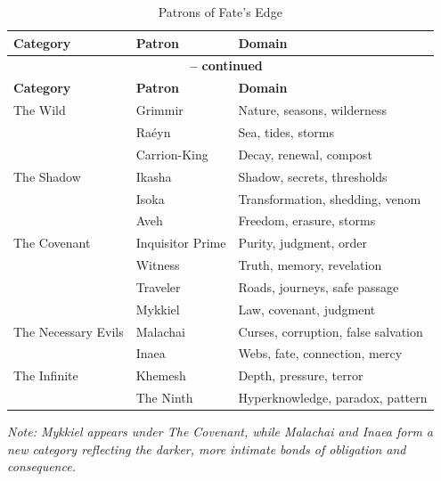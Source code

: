 \documentclass[10pt,a5paper]{book}
\begin{document}
\begin{center}
\begin{longtable}{p{3cm} p{5cm} p{5cm}}
\caption{Patrons of Fate's Edge}\\
\toprule
\textbf{Category} & \textbf{Patron} & \textbf{Domain} \\
\midrule
\endfirsthead
\multicolumn{3}{c}{{\bfseries \tablename\ \thetable{} -- continued}} \\
\toprule
\textbf{Category} & \textbf{Patron} & \textbf{Domain} \\
\midrule
\endhead
\bottomrule
\endfoot

The Wild & Grimmir & Nature, seasons, wilderness \\
      & Raéyn & Sea, tides, storms \\
      & Carrion-King & Decay, renewal, compost \\
\midrule
The Shadow & Ikasha & Shadow, secrets, thresholds \\
      & Isoka & Transformation, shedding, venom \\
      & Aveh & Freedom, erasure, storms \\
\midrule
The Covenant & Inquisitor Prime & Purity, judgment, order \\
      & Witness & Truth, memory, revelation \\
      & Traveler & Roads, journeys, safe passage \\
      & Mykkiel & Law, covenant, judgment \\
\midrule
The Necessary Evils & Malachai & Curses, corruption, false salvation \\
      & Inaea & Webs, fate, connection, mercy \\
\midrule
The Infinite & Khemesh & Depth, pressure, terror \\
      & The Ninth & Hyperknowledge, paradox, pattern \\
\bottomrule
\end{longtable}
\end{center}

\noindent \textit{Note: Mykkiel appears under The Covenant, while Malachai and Inaea form a new category reflecting the darker, more intimate bonds of obligation and consequence.}

\clearpage

\end{document}
